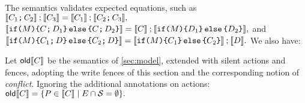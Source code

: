 The semantics validates expected equations, such as
\begin{math}
  \sem{\aCmd_1\SEMI\aCmd_2}\sequence\sem{\aCmd_3} =
  \sem{\aCmd_1}\sequence\sem{\aCmd_2\SEMI\aCmd_3},
\end{math}
\begin{math}
  \sem{\IF{\aExp} \THEN \aCmd \SEMI\bCmd_1\ELSE \aCmd\SEMI\bCmd_2\FI} =
  \sem{\aCmd}\sequence\sem{\IF{\aExp} \THEN \bCmd_1 \ELSE \bCmd_2\FI},
\end{math}
and
\begin{math}
  \sem{\IF{\aExp} \THEN \aCmd_1 \SEMI\bCmd\ELSE\allowbreak \aCmd_2\SEMI\bCmd\FI} =
  \sem{\IF{\aExp} \THEN \aCmd_1 \ELSE \aCmd_2\FI}\sequence\sem{\bCmd}.
\end{math}
We also have:
\begin{theorem}
  \label{thm:seq}
  Let $\semold{\aCmd}$ be the semantics of \textsection\ref{sec:model},
  extended with silent actions and fences, adopting the write fences of this
  section and the corresponding notion of \emph{conflict}.  Ignoring the
  additional annotations on actions:
\begin{math}
  \semold{\aCmd} = \{ \aPS\in\sem{\aCmd} \mid \disjoint{\Event}{\Sub}\}.
\end{math}
\end{theorem}


